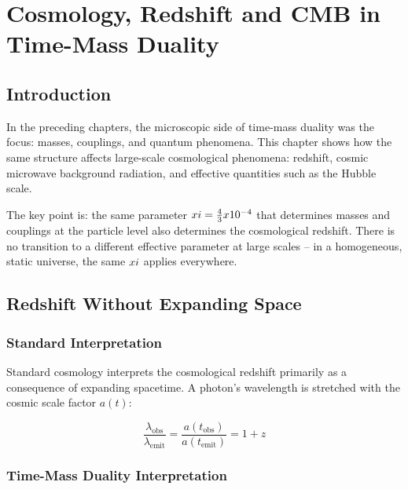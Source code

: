 
\chapter{Cosmology, Redshift and CMB in Time-Mass Duality}

\section{Introduction}

In the preceding chapters, the microscopic side of time-mass duality was the 
focus: masses, couplings, and quantum phenomena. This chapter shows how the 
same structure affects large-scale cosmological phenomena: redshift, cosmic 
microwave background radiation, and effective quantities such as the Hubble scale.

The key point is: the same parameter $xi = \frac{4}{3} x 10^{-4}$ 
that determines masses and couplings at the particle level also determines 
the cosmological redshift. There is no transition to a different effective 
parameter at large scales -- in a homogeneous, static universe, the same 
$xi$ applies everywhere.

\section{Redshift Without Expanding Space}

\subsection{Standard Interpretation}

Standard cosmology interprets the cosmological redshift primarily as a 
consequence of expanding spacetime. A photon's wavelength is stretched 
with the cosmic scale factor $a(t)$:

\begin{equation}
\frac{\lambda_{\text{obs}}}{\lambda_{\text{emit}}} = \frac{a(t_{\text{obs}})}{a(t_{\text{emit}})} = 1 + z
\end{equation}

\subsection{Time-Mass Duality Interpretation}

